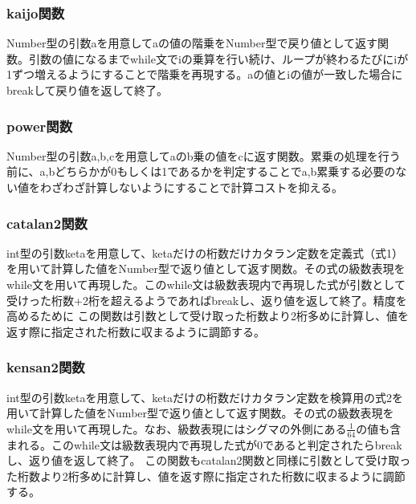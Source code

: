 \documentclass[a4j,dvipdfmx,titlepage]{jarticle}
\begin{document}
\subsubsection{kaijo関数}
Number型の引数aを用意してaの値の階乗をNumber型で戻り値として返す関数。引数の値になるまでwhile文でiの乗算を行い続け、ループが終わるたびにiが1ずつ増えるようにすることで階乗を再現する。aの値とiの値が一致した場合にbreakして戻り値を返して終了。
\subsubsection{power関数}
Number型の引数a,b,cを用意してaのb乗の値をcに返す関数。累乗の処理を行う前に、a,bどちらかが0もしくは1であるかを判定することでa,b累乗する必要のない値をわざわざ計算しないようにすることで計算コストを抑える。
\subsubsection{catalan2関数}
int型の引数ketaを用意して、ketaだけの桁数だけカタラン定数を定義式（式1）を用いて計算した値をNumber型で返り値として返す関数。その式の級数表現をwhile文を用いて再現した。このwhile文は級数表現内で再現した式が引数として受けった桁数+2桁を超えるようであればbreakし、返り値を返して終了。精度を高めるために
この関数は引数として受け取った桁数より2桁多めに計算し、値を返す際に指定された桁数に収まるように調節する。
\subsubsection{kensan2関数}
int型の引数ketaを用意して、ketaだけの桁数だけカタラン定数を検算用の式2を用いて計算した値をNumber型で返り値として返す関数。その式の級数表現をwhile文を用いて再現した。なお、級数表現にはシグマの外側にある$\frac{1}{64}$の値も含まれる。このwhile文は級数表現内で再現した式が0であると判定されたらbreakし、返り値を返して終了。
この関数もcatalan2関数と同様に引数として受け取った桁数より2桁多めに計算し、値を返す際に指定された桁数に収まるように調節する。
\end{document}
